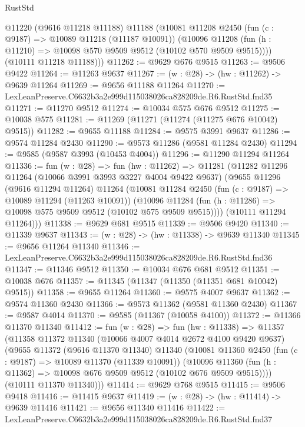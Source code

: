 \begin{lexlean}{RustStd}
\begin{coremodule}
        @11220
        (@9616 @11218 @11188)
        @11188
        (@10081
          @11208
          @2450
          (fun (c : @9187) => @10089 @11218 (@11187 @10091))
          (@10096 @11208 (fun (h : @11210) => @10098 @570 @9509 @9512 (@10102 @570 @9509 @9515))))
        (@10111 @11218 @11188)))
@11262 := @9629 @676 @9515
@11263 := @9506 @9422
@11264 := @11263 @9637
@11267 := (w : @28) -> (hw : @11262) -> @9639 @11264
@11269 := @9656 @11188 @11264
@11270 := LexLeanPreserve.C6632b3a2e999d115038026ca828209de.R6.RustStd.fnd35
@11271 := @11270 @9512
@11274 := @10034 @575 @676 @9512
@11275 := @10038 @575
@11281 := @11269 (@11271 (@11274 (@11275 @676 @10042) @9515))
@11282 := @9655 @11188
@11284 := @9575 @3991 @9637
@11286 := @9574 @11284 @2430
@11290 := @9573 @11286 (@9581 @11284 @2430)
@11294 := @9585 (@9587 @3993 (@10453 @4004))
@11296 := @11290 @11294 @11264
@11336 := fun (w : @28) =>
  fun (hw : @11262) =>
  @11281
    (@11282
      @11296
      @11264
      (@10066 @3991 @3993 @3227 @4004 @9422 @9637)
      (@9655
        @11296
        (@9616 @11294 @11264)
        @11264
        (@10081
          @11284
          @2450
          (fun (c : @9187) => @10089 @11294 (@11263 @10091))
          (@10096 @11284 (fun (h : @11286) => @10098 @575 @9509 @9512 (@10102 @575 @9509 @9515))))
        (@10111 @11294 @11264)))
@11338 := @9629 @681 @9515
@11339 := @9506 @9420
@11340 := @11339 @9637
@11343 := (w : @28) -> (hw : @11338) -> @9639 @11340
@11345 := @9656 @11264 @11340
@11346 := LexLeanPreserve.C6632b3a2e999d115038026ca828209de.R6.RustStd.fnd36
@11347 := @11346 @9512
@11350 := @10034 @676 @681 @9512
@11351 := @10038 @676
@11357 := @11345 (@11347 (@11350 (@11351 @681 @10042) @9515))
@11358 := @9655 @11264
@11360 := @9575 @4007 @9637
@11362 := @9574 @11360 @2430
@11366 := @9573 @11362 (@9581 @11360 @2430)
@11367 := @9587 @4014
@11370 := @9585 (@11367 (@10058 @4100))
@11372 := @11366 @11370 @11340
@11412 := fun (w : @28) =>
  fun (hw : @11338) =>
  @11357
    (@11358
      @11372
      @11340
      (@10066 @4007 @4014 @2672 @4100 @9420 @9637)
      (@9655
        @11372
        (@9616 @11370 @11340)
        @11340
        (@10081
          @11360
          @2450
          (fun (c : @9187) => @10089 @11370 (@11339 @10091))
          (@10096 @11360 (fun (h : @11362) => @10098 @676 @9509 @9512 (@10102 @676 @9509 @9515))))
        (@10111 @11370 @11340)))
@11414 := @9629 @768 @9515
@11415 := @9506 @9418
@11416 := @11415 @9637
@11419 := (w : @28) -> (hw : @11414) -> @9639 @11416
@11421 := @9656 @11340 @11416
@11422 := LexLeanPreserve.C6632b3a2e999d115038026ca828209de.R6.RustStd.fnd37

\end{coremodule}
\end{lexlean}
